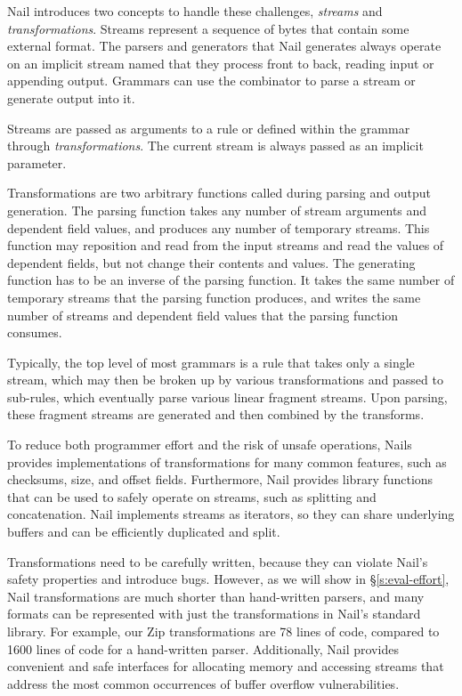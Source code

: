 Nail introduces two concepts to handle these challenges, \emph{streams} and \emph{transformations}. 
Streams represent a sequence of bytes that contain some external format. The parsers and generators
that Nail generates always operate on an implicit stream named  that they process front to
back, reading input or appending output.
Grammars can use the  combinator to parse a stream or generate output into it. 

Streams are passed as arguments to a rule or defined within the grammar through \emph{transformations}.
The current stream is always passed as an implicit parameter.

Transformations are two arbitrary functions called during parsing and output generation.
The parsing function  takes any number of stream arguments and dependent field values,
and produces any number of temporary streams. This function may reposition and read from the
input streams and read the values of dependent fields, but not change their contents and values. 
The generating function has to be an inverse of the parsing function. It takes the same number of
temporary streams that the parsing function produces, and writes the same number of streams and
dependent field values that the parsing function consumes.

Typically, the top level of most grammars is a rule that takes only a single stream, which may then
be broken up by various transformations and passed to sub-rules, which eventually parse various linear
fragment streams. Upon parsing, these fragment streams are generated and then combined by the
transforms.

 To reduce both programmer effort and the risk of unsafe operations, Nails provides implementations of
transformations for many common features, such as checksums, size, and offset fields. Furthermore,
Nail provides library functions that can be used to safely operate on streams, such as splitting and
concatenation. Nail implements streams as iterators, so they can share underlying buffers and can be
efficiently duplicated and split.

Transformations need to be carefully written, because they can violate Nail's safety properties
and introduce
bugs. However, as we will show in \S\ref{s:eval-effort}, Nail transformations are much shorter than
hand-written parsers, and many formats can be represented with just the transformations in Nail's
standard library.
For example, our Zip transformations are 78 lines of code, compared to 1600 lines of code for a
   hand-written parser. Additionally, Nail provides convenient and safe interfaces for allocating
   memory and accessing streams that address the most common occurrences of buffer overflow
   vulnerabilities.  

